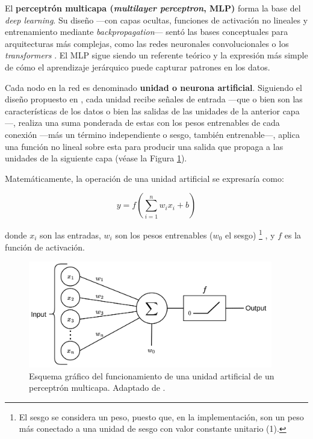 El \textbf{perceptrón multicapa (\textit{multilayer perceptron}, \acrshort{MLP})} forma la base del \textit{deep learning}. Su diseño ---con capas ocultas, funciones de activación no lineales y entrenamiento  mediante \textit{backpropagation}--- sentó las bases conceptuales para arquitecturas más complejas, como las redes neuronales convolucionales o los \textit{transformers} \cite{murphy2022}. El \acrshort{MLP} sigue siendo un referente teórico y la expresión más simple de cómo el aprendizaje jerárquico puede capturar patrones en los datos. 

Cada nodo en la red es denominado \textbf{unidad o neurona artificial}. Siguiendo el diseño propuesto en \cite{mcculloch1943,rosenblatt1958}, cada unidad recibe señales de entrada ---que o bien son las características de los datos o bien las salidas de las unidades de la anterior capa---, realiza una suma ponderada de estas con los pesos entrenables de cada conexión ---más un término independiente o sesgo, también entrenable---, aplica una función no lineal sobre esta para producir una salida que propaga a las unidades de la siguiente capa (véase la Figura \ref{fig:neuron_MLP}).

Matemáticamente, la operación de una unidad artificial se expresaría como:

$$
y = f \left( \sum_{i=1}^n{w_ix_i+b} \right)
$$

donde $x_i$ son las entradas, $w_i$ son los pesos entrenables ($w_0$ el sesgo)%
\footnote{
    El sesgo se considera un peso, puesto que, en la implementación, son un peso más conectado a una unidad de sesgo con valor constante unitario (1).
}
, y $f$ es la función de activación.

\begin{figure}[htbp]
    \centering
    \includegraphics[width=0.95\textwidth]{capitulos/cap_02/imagenes/Neuron_perceptron.png}
    \caption[
        Esquema gráfico del funcionamiento de una unidad artificial de un perceptrón multicapa.
    ]{
        Esquema gráfico del funcionamiento de una unidad artificial de un perceptrón multicapa. 
        Adaptado de \cite{codeworld2022understandingMLDL}.
    } 
    \label{fig:neuron_MLP}
\end{figure}


